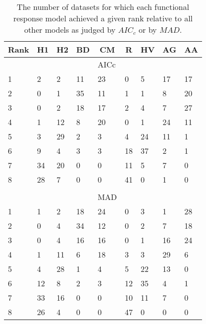 \begin{table}[!tbp]
\caption{The number of datasets for which each functional response model achieved a given rank relative to all other models as judged by $AIC_c$ or by $MAD$.\label{table:AICc_and_MAD_rankings}} 
\begin{center}
\begin{tabular}{lllllllll}
\hline\hline
\multicolumn{1}{l}{Rank}&\multicolumn{1}{c}{H1}&\multicolumn{1}{c}{H2}&\multicolumn{1}{c}{BD}&\multicolumn{1}{c}{CM}&\multicolumn{1}{c}{R}&\multicolumn{1}{c}{HV}&\multicolumn{1}{c}{AG}&\multicolumn{1}{c}{AA}\tabularnewline
\hline
&&&&AICc&&&&\tabularnewline
1&2&2&11&23&0&5&17&17\tabularnewline
2&0&1&35&11&1&1&8&20\tabularnewline
3&0&2&18&17&2&4&7&27\tabularnewline
4&1&12&8&20&0&1&24&11\tabularnewline
5&3&29&2&3&4&24&11&1\tabularnewline
6&9&4&3&3&18&37&2&1\tabularnewline
7&34&20&0&0&11&5&7&0\tabularnewline
8&28&7&0&0&41&0&1&0\tabularnewline
&&&&&&&&\tabularnewline
&&&&MAD&&&&\tabularnewline
1&1&2&18&24&0&3&1&28\tabularnewline
2&0&4&34&12&0&2&7&18\tabularnewline
3&0&4&16&16&0&1&16&24\tabularnewline
4&1&11&6&18&3&3&29&6\tabularnewline
5&4&28&1&4&5&22&13&0\tabularnewline
6&12&8&2&3&12&35&4&1\tabularnewline
7&33&16&0&0&10&11&7&0\tabularnewline
8&26&4&0&0&47&0&0&0\tabularnewline
\hline
\end{tabular}\end{center}
\end{table}
